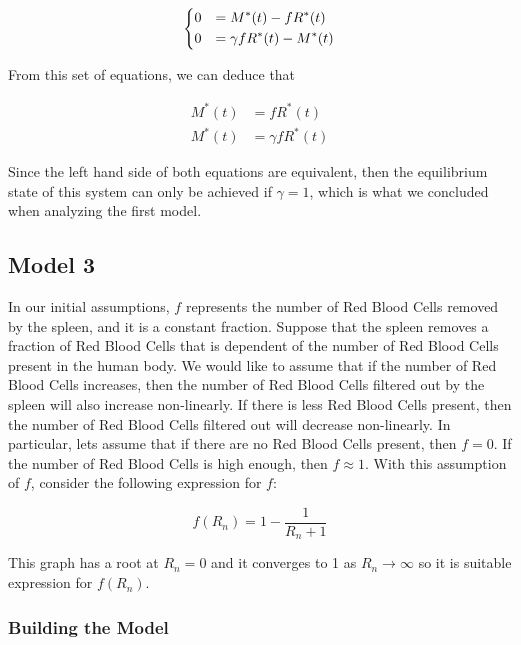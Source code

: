 \begin{equation*}
    \begin{dcases}
        0 &= M^\ast(t)-fR^\ast(t)\\
        0 &= \gamma fR^\ast(t) - M^\ast(t)
    \end{dcases}
\end{equation*}

From this set of equations, we can deduce that

\begin{align*}
    M^\ast(t) &= fR^\ast(t)\\
    M^\ast(t) &= \gamma fR^\ast(t)
\end{align*}

Since the left hand side of both equations are equivalent, then the equilibrium state of this system can only be achieved if $\gamma = 1$, which is what we concluded when analyzing the first model.

\subsection{Model 3}
\label{subsec:model-3}

In our initial assumptions, $f$ represents the number of Red Blood Cells removed by the spleen, and it is a constant fraction. Suppose that the spleen removes a fraction of Red Blood Cells that is dependent of the number of Red Blood Cells present in the human body. We would like to assume that if the number of Red Blood Cells increases, then the number of Red Blood Cells filtered out by the spleen will also increase non-linearly. If there is less Red Blood Cells present, then the number of Red Blood Cells filtered out will decrease non-linearly. In particular, lets assume that if there are no Red Blood Cells present, then $f=0$. If the number of Red Blood Cells is high enough, then $f \approx 1$. With this assumption of $f$, consider the following expression for $f$:

\begin{equation*}
    f(R_n) = 1 - \frac{1}{R_n+1}
\end{equation*}

This graph has a root at $R_n=0$ and it converges to 1 as $R_n\to\infty$ so it is suitable expression for $f(R_n)$.

\subsubsection{Building the Model}

